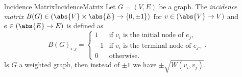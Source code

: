 \begin{mdef}{Incidence Matrix}{IncidenceMatrix}
    Let $G=(V,E)$ be a graph. The \emph{incidence matrix} $B(G)\in (\abs{V}\times \abs{E}\to \{0,\pm 1\})$ for $v\in(\abs{V}\to V)$ and $e\in(\abs{E}\to E)$ is defined as
    \[
        B(G)_{i,j} = \begin{cases}
            1 & \text{if } v_i \text{ is the initial node of } e_j,\\
            -1 & \text{if } v_i \text{ is the terminal node of } e_j,\\
            0 & \text{otherwise}.
        \end{cases}.
    \]
    Is $G$ a weighted graph, then instead of $\pm 1$ we have $\pm\sqrt{W(v_i,v_j)}$.
\end{mdef}